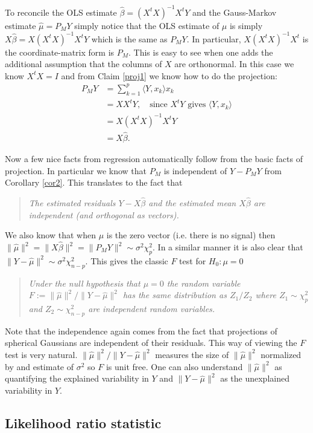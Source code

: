\documentclass[11pt]{report}
\begin{document}
To reconcile the OLS estimate  $\hat\beta = (X^tX)^{-1}X^t Y$ and the Gauss-Markov estimate $\hat\mu = P_M Y$ simply notice that the OLS estimate of $\mu$ is simply $X\hat \beta = X(X^tX)^{-1}X^t Y$ which is the same as $P_M Y$. In particular, $X(X^tX)^{-1}X^t$ is the coordinate-matrix form is $P_M$. This is easy to see when one adds the additional assumption that the columns of $X$ are orthonormal. In this case we know $X^tX = I$ and from Claim \ref{proj1} we know how to do the projection:
\begin{align*}
P_M Y &= \sum_{k=1}^p \langle Y, x_k\rangle x_k \\
&= XX^tY,\quad\text{since $X^tY$ gives $\langle Y, x_k\rangle$}\\
&= X(X^tX)^{-1}X^tY \\
&= X\hat \beta.  
\end{align*}

Now a few nice facts from regression automatically follow from the basic facts of projection. In particular we know that $P_M$ is independent of $Y-P_MY$ from Corollary \ref{cor2}. This translates to the fact that 
\begin{quote}
\em The estimated residuals $Y - X\hat \beta$ and the estimated mean $X\hat \beta$ are independent (and orthogonal as vectors).
\end{quote}
We also know that when $\mu$ is the zero vector (i.e. there is no signal) then $\|\hat \mu \|^2 = \|X\hat\beta \|^2 = \|P_M Y \|^2\sim  \sigma^2 \chi^2_p$. In a similar manner it is also clear that $\|Y - \hat \mu \|^2\sim \sigma^2 \chi^2_{n-p}$. This gives the classic $F$ test for $H_0:\mu=0$
\begin{quote}
\em
Under the null hypothesis that $\mu = 0$ the random variable $F:= {\|\hat \mu \|^2}/{\|Y - \hat \mu \|^2}$ has the same distribution as ${Z_1}/{Z_2}$ where $Z_1\sim \chi^2_p$ and $Z_2\sim \chi^2_{n-p}$ are independent random variables.
\end{quote}
Note that the independence again comes from the fact that projections of spherical Gaussians are independent of their residuals. This way of viewing the $F$ test is very natural. ${\|\hat \mu \|^2}/{\|Y - \hat \mu \|^2}$ measures the size of $\| \hat \mu\|^2$ normalized by and estimate of $\sigma^2$ so $F$ is unit free. One can also understand $\| \hat \mu\|^2$ as quantifying the explained variability in $Y$ and $\|Y - \hat \mu \|^2$ as the unexplained variability in $Y$.


\subsection{Likelihood ratio statistic}
\end{document}
